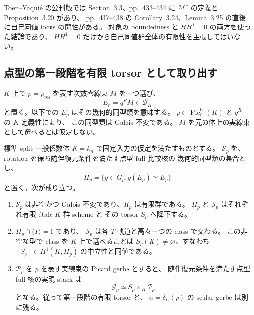 \begin{remark}[一次資料の使用箇所]
To\"en--Vaqui\'e の公刊版では Section~3.3、pp.~433--434 に
$\mathcal M^\nu$ の定義と Proposition~3.20 があり、
pp.~437--438 の Corollary~3.24、Lemma~3.25 の直後に自己同値 locus の開性がある。
対象の boundedness と $HH^1=0$ の両方を使った結論であり、
$HH^1=0$ だけから自己同値群全体の有限性を主張してはいない。
\end{remark}

\subsection{点型の第一段階を有限 torsor として取り出す}

$\overline K$ 上で $p=p_{\mathrm{res}}$ を表す次数零線束 $M$ を一つ選び、
\[
 E_p=q^R M\in\mathcal B_{\overline K}
\]
と置く。以下での $E_p$ はその幾何的同型類を意味する。
$p\in\operatorname{Pic}^0_C(K)$ と $q^R$ の $K$-定義性により、
この同型類は Galois 不変である。
$M$ を元の体上の実線束として選べるとは仮定しない。

\begin{theorem}
\label{thm:nfm-adjoint-point-finite-class-torsor}
標準 split 一般係数体 $K=k_n$ で固定入力の仮定を満たすものとする。
$\mathscr S_p$ を、rotation を保ち随伴復元条件を満たす点型 full 比較核の
幾何的同型類の集合とし、
\[
 H_p=\{g\in G_\rho:g(E_p)\simeq E_p\}
\]
と置く。次が成り立つ。
\begin{enumerate}[label=\textup{(\roman*)}]
\item $\mathscr S_p$ は非空かつ Galois 不変であり、$H_p$ は有限群である。
      $H_p$ と $\mathscr S_p$ はそれぞれ有限 \'etale $K$-群 scheme と
      その torsor $S_p$ へ降下する。
\item $H_p\cap\langle T\rangle=1$ であり、
      $\mathscr S_p$ は各 $T$-軌道と高々一つの class で交わる。
      この非空な型で class を $K$ 上で選べることは
      $S_p(K)\ne\varnothing$、すなわち $[S_p]\in H^1(K,H_p)$ の中立性と同値である。
\item $\mathscr P_p$ を $p$ を表す実線束の Picard gerbe とすると、
      随伴復元条件を満たす点型 full 核の実現 stack は
      \[
       \mathscr G_p\simeq S_p\times_K\mathscr P_p
      \]
      となる。従って第一段階の有限 torsor と、
      $\alpha=\delta_C(p)$ の scalar gerbe は別に残る。
\end{enumerate}
\end{theorem}

